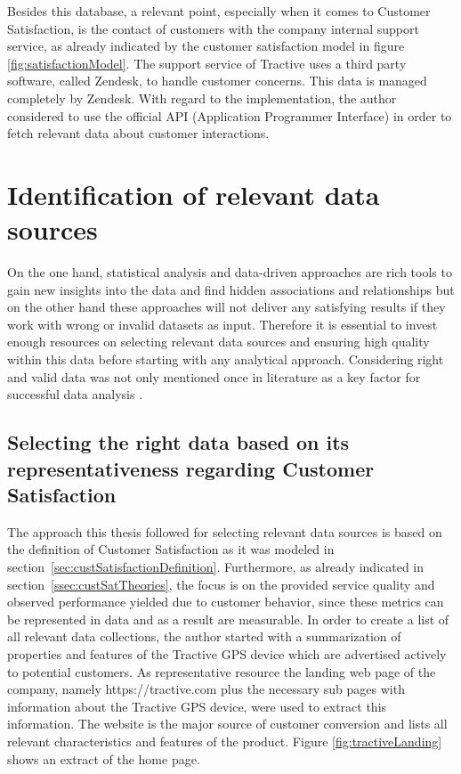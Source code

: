 Besides this database, a relevant point, especially when it comes to Customer Satisfaction, is the contact of customers with the company internal support service, as already indicated by the customer satisfaction model in figure \ref{fig:satisfactionModel}. The support service of Tractive uses a third party software, called Zendesk, to handle customer concerns. This data is managed completely by Zendesk. With regard to the implementation, the author considered to use the official API (Application Programmer Interface) in order to fetch relevant data about customer interactions. 

\section{Identification of relevant data sources}
\label{sec:dataSources}
On the one hand, statistical analysis and data-driven approaches are rich tools to gain new insights into the data and find hidden associations and relationships but on the other hand these approaches will not deliver any satisfying results if they work with wrong or invalid datasets as input. Therefore it is essential to invest enough resources on selecting relevant data sources and ensuring high quality within this data before starting with any analytical approach. Considering right and valid data was not only mentioned once in literature as a key factor for successful data analysis \cite{neckel2015}. 

\subsection{Selecting the right data based on its representativeness regarding Customer Satisfaction}
The approach this thesis followed for selecting relevant data sources is based on the definition of Customer Satisfaction as it was modeled in section~\ref{sec:custSatisfactionDefinition}. Furthermore, as already indicated in section~\ref{ssec:custSatTheories}, the focus is on the provided service quality and observed performance yielded due to customer behavior, since these metrics can be represented in data and as a result are measurable. In order to create a list of all relevant data collections, the author started with a summarization of properties and features of the Tractive GPS device which are advertised actively to potential customers. As representative resource the landing web page of the company, namely https://tractive.com plus the necessary sub pages with information about the Tractive GPS device, were used to extract this information. The website is the major source of customer conversion and lists all relevant characteristics and features of the product. Figure \ref{fig:tractiveLanding} shows an extract of the home page.

